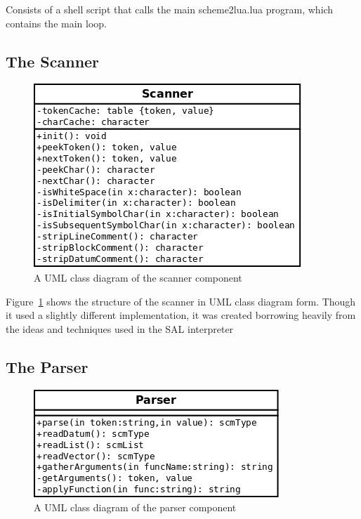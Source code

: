 Consists of a shell script that calls the main scheme2lua.lua program, which
contains the main loop.

\subsection{The Scanner}

\begin{figure}
\centering
\includegraphics[width=\textwidth]{scannerUML.png}
\caption{A UML class diagram of the scanner component}
\label{fig:scannerUML}
\end{figure}

Figure~\ref{fig:scannerUML} shows the structure of the scanner in UML class
diagram form. Though it used a slightly different implementation, it was created
borrowing heavily from the ideas and techniques used in the SAL
interpreter~\cite{sal}

\subsection{The Parser}

\begin{figure}
\centering
\includegraphics[width=\textwidth]{parserUML.png}
\caption{A UML class diagram of the parser component}
\label{fig:parserUML}
\end{figure}

